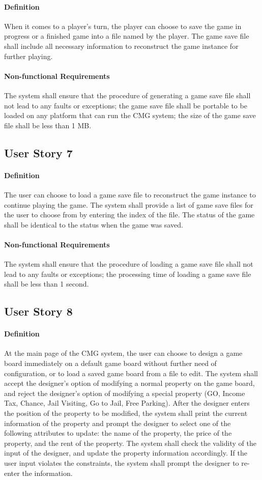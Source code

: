 \documentclass{article}
\begin{document}
\paragraph{Definition} When it comes to a player's turn, the player can choose to save the game in progress or a finished game into a file
named by the player.  The game save file shall include all necessary information to reconstruct the game instance for further playing.
\paragraph{Non-functional Requirements} The system shall ensure that the procedure of generating a game save file shall not lead to any faults or exceptions;
the game save file shall be portable to be loaded on any platform that can run the CMG system; the size of the game save file shall be less than 1 MB.

\subsection{User Story 7} 
\paragraph{Definition} The user can choose to load a game save file to reconstruct the game instance to continue playing the game.
The system shall provide a list of game save files for the user to choose from by entering the index of the file.
The status of the game shall be identical to the status when the game was saved.
\paragraph{Non-functional Requirements} The system shall ensure that the procedure of loading a game save file shall not lead to any faults or exceptions;
the processing time of loading a game save file shall be less than 1 second.

\subsection{User Story 8}
\paragraph{Definition} At the main page of the CMG system, the user can choose to design a game board immediately on a default game board without further need of configuration, or to load a saved game board from a file to edit.
The system shall accept the designer's option of modifying a normal property on the game board, and
reject the designer's option of modifying a special property (GO, Income Tax, Chance, Jail Visiting, Go to Jail, Free Parking).
After the designer enters the position of the property to be modified, the system shall print the current information of the property and prompt the designer to select one of 
the following attributes to update: the name of the property, the price of the property, and the rent of the property.
The system shall check the validity of the input of the designer, and update the property information accordingly.
If the user input violates the constraints, the system shall prompt the designer to re-enter the information.
\end{document}
